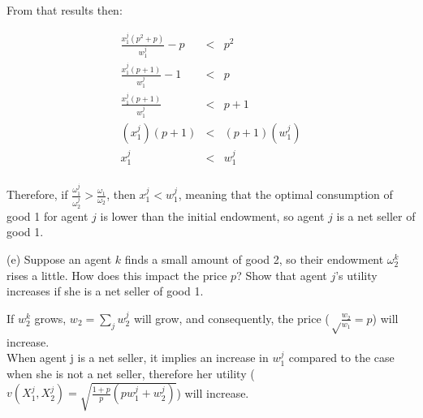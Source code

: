 From that results then:


\begin{eqnarray*}
\frac{x_1^j(p^2+p)}{w_1^j}-p&<&p^2\\
\frac{x_1^j(p+1)}{w_1^j}-1&<&p\\
\frac{x_1^j(p+1)}{w_1^j}&<&p+1\\
(x_1^j)(p+1)&<&(p+1)(w_1^j)\\
x_1^j&<&w_1^j\\
\end{eqnarray*}

\begin{myanswerbox}
    Therefore, if \( \frac{\omega^j_1}{\omega^j_2} > \frac{\omega_1}{\omega_2} \), then \( x_1^j<w_1^j \), meaning that the optimal consumption of good 1 for agent $j$ is lower than the initial endowment, so agent $j$ is a net seller of good 1.
\end{myanswerbox}
\begin{tcolorbox}
        (e) Suppose an agent \( k \) finds a small amount of good 2, so their endowment \( \omega^k_2 \) rises a little. How does this impact the price \( p \)? Show that agent \( j \)'s utility increases if she is a net seller of good 1.
\end{tcolorbox}

If $w_2^k$ grows, $ w_2= \sum_{j} w_2^j$ will grow, and consequently, the price ($\sqrt\frac{w_2}{w_1} = p$) will increase.\\

When agent j is a net seller, it implies an increase in $w_1^j$ compared to the case when she is not a net seller, therefore her utility ($v(X_1^j,X_2^j)=\sqrt{\frac{1+p}{p}(pw_1^j+w_2^j)}$) will increase.
